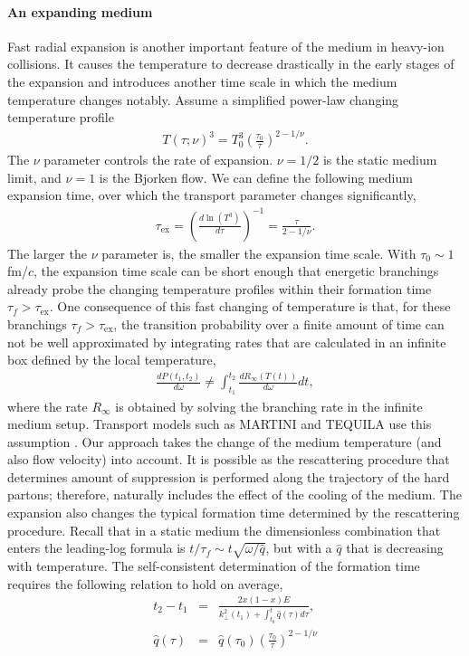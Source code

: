 \paragraph{An expanding medium}
Fast radial expansion is another important feature of the medium in heavy-ion collisions.
It causes the temperature to decrease drastically in the early stages of the expansion and introduces another time scale in which the medium temperature changes notably.
Assume a simplified power-law changing temperature profile
\begin{eqnarray}
T(\tau; \nu)^3 = T_0^3\left(\frac{\tau_0}{\tau}\right)^{2-1/\nu}.
\end{eqnarray}
The $\nu$ parameter controls the rate of expansion. 
$\nu = 1/2$ is the static medium limit, and $\nu=1$ is the Bjorken flow.
We can define the following medium expansion time, over which the transport parameter changes significantly,
\begin{eqnarray}
\tau_{\textrm{ex}} = \left(\frac{d\ln(T^3)}{d \tau} \right)^{-1} = \frac{\tau}{2-1/\nu}.
\end{eqnarray}
The larger the $\nu$ parameter is, the smaller the expansion time scale.
With $\tau_0 \sim 1$ fm/$c$, the expansion time scale can be short enough that energetic branchings already probe the changing temperature profiles within their formation time $\tau_f > \tau_{\textrm{ex}}$.
One consequence of this fast changing of temperature is that, for these branchings $\tau_f > \tau_{\textrm{ex}}$, the transition probability over a finite amount of time can not be well approximated by integrating rates that are calculated in an infinite box defined by the local temperature,
\begin{eqnarray}
\frac{dP(t_1, t_2)}{d\omega} \neq \int_{t_1}^{t_2} \frac{dR_{\infty}(T(t))}{d\omega} dt,
\end{eqnarray}
where the rate $R_\infty$ is obtained by solving the branching rate in the infinite medium setup. 
Transport models such as MARTINI and TEQUILA use this assumption \cite{Jeon:2003gi,Schenke:2009gb,Dai:2019hbi}.
Our approach takes the change of the medium temperature (and also flow velocity) into account.
It is possible as the rescattering procedure that determines amount of suppression is performed along the trajectory of the hard partons; therefore, naturally includes the effect of the cooling of the medium.
The expansion also changes the typical formation time determined by the rescattering procedure.
Recall that in a static medium the dimensionless combination that enters the leading-log formula is $t/\tau_f \sim t \sqrt{\omega/\hat{q}}$, but with a $\hat{q}$ that is decreasing with temperature.
The self-consistent determination of the formation time requires the following relation to hold on average,
\begin{eqnarray}
t_2 - t_1 &=& \frac{2x(1-x)E}{k_{\perp}^2(t_1) + \int_{t_0}^{t} \hat{q}(\tau) d\tau},\\
\hat{q}(\tau) &=& \hat{q}(\tau_0) \left(\frac{\tau_0}{\tau}\right)^{2-1/\nu}
\end{eqnarray}


